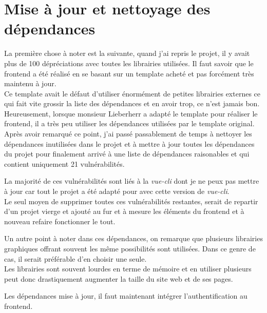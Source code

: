 \documentclass[
    iai, %
    il, %
]{heig-tb}
\begin{document}
\section{Mise à jour et nettoyage des dépendances}
La première chose à noter est la suivante, quand j'ai repris le projet, il y avait plus de 100 dépréciations avec toutes les librairies utilisées. Il faut savoir que le \Gls{frontend} a été réalisé en se basant sur un template acheté et pas forcément très maintenu à jour. \\
Ce template avait le défaut d'utiliser énormément de petites librairies externes ce qui fait vite grossir la liste des dépendances et en avoir trop, ce n'est jamais bon. \\
Heureusement, lorsque monsieur Lieberherr a adapté le template pour réaliser le \Gls{frontend}, il a très peu utiliser les dépendances utilisées par le template original.\\
Après avoir remarqué ce point, j'ai passé passablement de temps à nettoyer les dépendances inutilisées dans le projet et à mettre à jour toutes les dépendances du projet pour finalement arrivé à une liste de dépendances raisonables et qui contient uniquement 21 vulnérabilités.

La majorité de ces vulnérabilités sont liés à la \emph{vue-cli} dont je ne peux pas mettre à jour car tout le projet a été adapté pour avec cette version de \emph{vue-cli}. \\
Le seul moyen de supprimer toutes ces vulnérabilités restantes, serait de repartir d'un projet vierge et ajouté au fur et à mesure les éléments du \Gls{frontend} et à nouveau refaire fonctionner le tout.

Un autre point à noter dans ces dépendances, on remarque que plusieurs librairies graphiques offrant souvent les même possibilités sont utilisées. Dans ce genre de cas, il serait préférable d'en choisir une seule. \\
Les librairies sont souvent lourdes en terme de mémoire et en utiliser plusieurs peut donc drastiquement augmenter la taille du site web et de ses pages.

Les dépendances mise à jour, il faut maintenant intégrer l'authentification au \Gls{frontend}.
\end{document}

